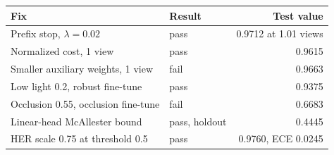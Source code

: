 \begin{tabular}{llr}
\hline
Fix & Result & Test value \\
\hline
Prefix stop, $\lambda=0.02$ & pass & 0.9712 at 1.01 views \\
Normalized cost, 1 view & pass & 0.9615 \\
Smaller auxiliary weights, 1 view & fail & 0.9663 \\
Low light 0.2, robust fine-tune & pass & 0.9375 \\
Occlusion 0.55, occlusion fine-tune & fail & 0.6683 \\
Linear-head McAllester bound & pass, holdout & 0.4445 \\
HER scale 0.75 at threshold 0.5 & pass & 0.9760, ECE 0.0245 \\
\hline
\end{tabular}
